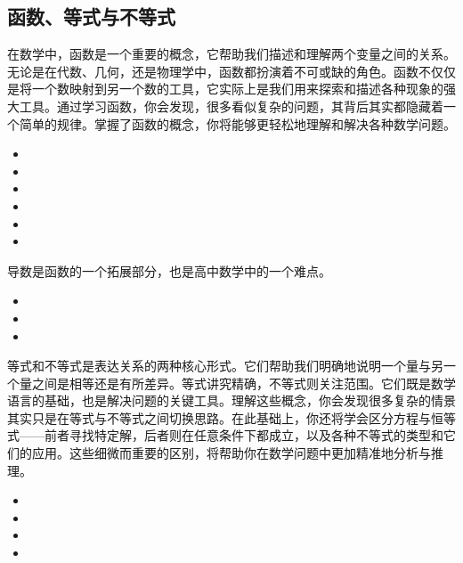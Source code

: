 \subsection{函数、等式与不等式}

在数学中，函数是一个重要的概念，它帮助我们描述和理解两个变量之间的关系。无论是在代数、几何，还是物理学中，函数都扮演着不可或缺的角色。函数不仅仅是将一个数映射到另一个数的工具，它实际上是我们用来探索和描述各种现象的强大工具。通过学习函数，你会发现，很多看似复杂的问题，其背后其实都隐藏着一个简单的规律。掌握了函数的概念，你将能够更轻松地理解和解决各种数学问题。

\begin{itemize}
\item {}
\item {}
\item {}
\item {}
\item {}
\item {}
\end{itemize}

导数是函数的一个拓展部分，也是高中数学中的一个难点。

\begin{itemize}
\item {}
\item {}
\item {}
\end{itemize}

等式和不等式是表达关系的两种核心形式。它们帮助我们明确地说明一个量与另一个量之间是相等还是有所差异。等式讲究精确，不等式则关注范围。它们既是数学语言的基础，也是解决问题的关键工具。理解这些概念，你会发现很多复杂的情景其实只是在等式与不等式之间切换思路。在此基础上，你还将学会区分方程与恒等式——前者寻找特定解，后者则在任意条件下都成立，以及各种不等式的类型和它们的应用。这些细微而重要的区别，将帮助你在数学问题中更加精准地分析与推理。

\begin{itemize}
\item {}
\item {}
\item {}
\item {}
\end{itemize}

